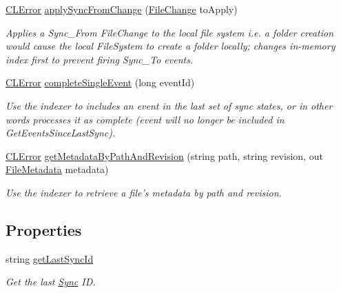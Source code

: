 \begin{DoxyCompactItemize}
$$\hyperlink{class_cloud_api_public_1_1_model_1_1_c_l_error}{C\-L\-Error} \hyperlink{class_cloud_api_public_1_1_file_monitor_1_1_sync_implementation_1_1_sync_data_a1b53a4cbe1af4a6d4fbef8e91df5dd61}{apply\-Sync\-From\-Change} (\hyperlink{class_cloud_api_public_1_1_model_1_1_file_change}{File\-Change} to\-Apply)
\begin{DoxyCompactList}\small\item\em Applies a Sync\-\_\-\-From File\-Change to the local file system i.\-e. a folder creation would cause the local File\-System to create a folder locally; changes in-\/memory index first to prevent firing Sync\-\_\-\-To events. \end{DoxyCompactList}\item 
\hyperlink{class_cloud_api_public_1_1_model_1_1_c_l_error}{C\-L\-Error} \hyperlink{class_cloud_api_public_1_1_file_monitor_1_1_sync_implementation_1_1_sync_data_a5e38e6571a2cf6ffc3e83cf2d8244090}{complete\-Single\-Event} (long event\-Id)
\begin{DoxyCompactList}\small\item\em Use the indexer to includes an event in the last set of sync states, or in other words processes it as complete (event will no longer be included in Get\-Events\-Since\-Last\-Sync). \end{DoxyCompactList}\item 
\hyperlink{class_cloud_api_public_1_1_model_1_1_c_l_error}{C\-L\-Error} \hyperlink{class_cloud_api_public_1_1_file_monitor_1_1_sync_implementation_1_1_sync_data_a5c98777421b3d68678ad50fc1edce93c}{get\-Metadata\-By\-Path\-And\-Revision} (string path, string revision, out \hyperlink{class_cloud_api_public_1_1_model_1_1_file_metadata}{File\-Metadata} metadata)
\begin{DoxyCompactList}\small\item\em Use the indexer to retrieve a file's metadata by path and revision. \end{DoxyCompactList}\end{DoxyCompactItemize}
\subsection*{Properties}
\begin{DoxyCompactItemize}
\item 
string \hyperlink{class_cloud_api_public_1_1_file_monitor_1_1_sync_implementation_1_1_sync_data_a62814239485178d07f3560cd5d6c9724}{get\-Last\-Sync\-Id}
\begin{DoxyCompactList}\small\item\em Get the last \hyperlink{namespace_cloud_api_public_1_1_sync}{Sync} I\-D. \end{DoxyCompactList}\end{DoxyCompactItemize}


